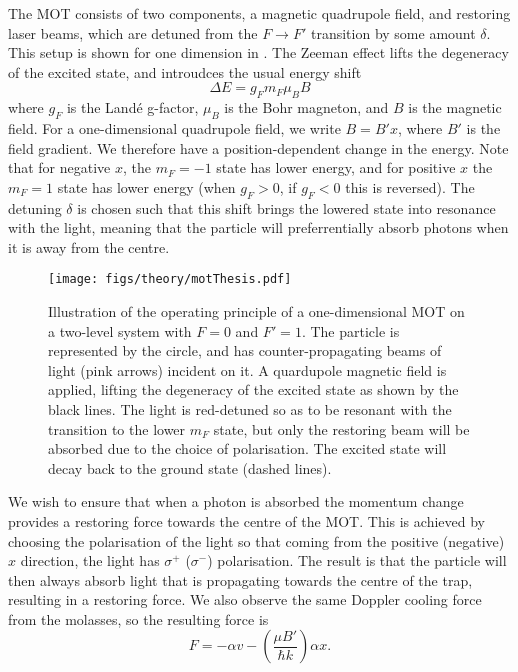 The MOT consists of two components, a magnetic quadrupole field, and restoring
laser beams, which are detuned from the $F\rightarrow F'$ transition by some
amount $\delta$. This setup is shown for one dimension in . The Zeeman effect lifts the degeneracy of the excited state, and
introudces the usual energy shift~\cite{Binney}
%
\begin{equation}
  \Delta E = g_F m_F \mu_B B
  \label{theory:eqn:zeeman}
\end{equation}
%
where $g_F$ is the Land\'e g-factor, $\mu_B$ is the Bohr magneton, and $B$ is
the magnetic field. For a one-dimensional quadrupole field, we write $B=B'x$,
where $B'$ is the field gradient. We therefore have a position-dependent change
in the energy. Note that for negative $x$, the $m_F=-1$ state has lower energy,
and for positive $x$ the $m_F=1$ state has lower energy (when $g_F>0$, if
$g_F<0$ this is reversed).
%
The detuning $\delta$ is chosen such that this shift brings the lowered state
into resonance with the light, meaning that the particle will preferrentially
absorb photons when it is away from the centre.

\begin{figure}[ht]
  \centering
  \texttt{[image: figs/theory/motThesis.pdf]}
  \caption{Illustration of the operating principle of a one-dimensional MOT on
    a two-level system with $F=0$ and $F'=1$. The particle is represented by
    the circle, and has counter-propagating beams of light (pink arrows)
    incident on it. A quardupole magnetic field is applied, lifting the
    degeneracy of the excited state as shown by the black lines. The light is
    red-detuned so as to be resonant with the transition to the lower $m_F$
    state, but only the restoring beam will be absorbed due to the choice of
    polarisation. The excited state will decay back to the ground state (dashed
    lines).
  }
  \label{theory:fig:MOT}
\end{figure}

We wish to ensure that when a photon is absorbed the momentum change provides a
restoring force towards the centre of the MOT. This is achieved by choosing the
polarisation of the light so that coming from the positive (negative) $x$
direction, the light has $\sigma^+$ ($\sigma^-$) polarisation. The result is
that the particle will then always absorb light that is propagating towards the
centre of the trap, resulting in a restoring force. We also observe the same
Doppler cooling force from the molasses, so the resulting force is
%
\begin{equation}
  F = - \alpha v - \left(\frac{\mu B'}{\hbar k}\right)\alpha x.
\end{equation}

